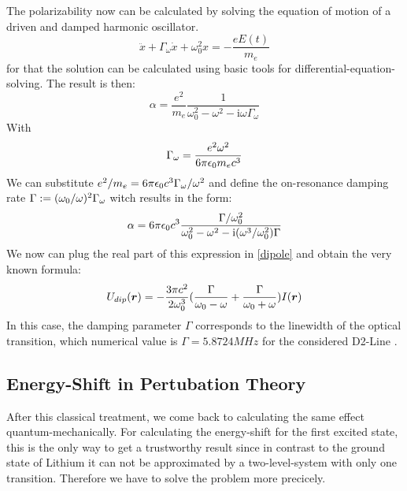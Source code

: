 The polarizability now can be calculated by solving the equation of motion of a driven and damped harmonic oscillator.
\begin{equation}
\ddot x+\Gamma_\omega\dot x+\omega^2_0x=-\frac{eE(t)}{m_e}
\end{equation} 
for that the solution can be calculated using basic tools for differential-equation-solving. The result is then:
\begin{equation}
\alpha=\frac{e^2}{m_e}\frac{1}{\omega^2_0-\omega^2-\mathrm{i}\omega\Gamma_\omega}
\end{equation} 
With
\begin{equation}
\Gamma_\omega=\frac{e^2\omega^2}{6\pi\epsilon_0m_ec^3}
\end{equation}
We can substitute $e^2/m_e=6\pi\epsilon_0c^3\Gamma_\omega/\omega^2$ and define the on-resonance damping rate $\Gamma:=(\omega_0/\omega)^2\Gamma_\omega$ witch results in the form:
\begin{equation}
\alpha=6\pi\epsilon_0c^3\frac{\Gamma/\omega^2_0}{\omega^2_0-\omega^2-\mathrm{i}(\omega^3/\omega^2_0)\Gamma}
\end{equation} 
We now can plug the real part of this expression in \ref{dipole} and obtain the very known formula:
\begin{equation}
U_{dip}(\boldsymbol{r})=-\frac{3\pi c^2}{2\omega^3_0}(\frac{\Gamma}{\omega_0-\omega}+\frac{\Gamma}{\omega_0+\omega})I(\boldsymbol{r})
\label{classic}\end{equation}
In this case, the damping parameter $\Gamma$ corresponds to the linewidth of the optical transition, which numerical value is $\Gamma=5.8724 \unit{MHz}$ for the considered D2-Line \cite{gehm}.

\subsection{Energy-Shift in Pertubation Theory}

After this classical treatment, we come back to calculating the same effect quantum-mechanically. For calculating the energy-shift for the first excited state, this is the only way to get a trustworthy result since in contrast to the ground state of Lithium it can not be approximated by a two-level-system with only one transition. Therefore we have to solve the problem more precicely. 

